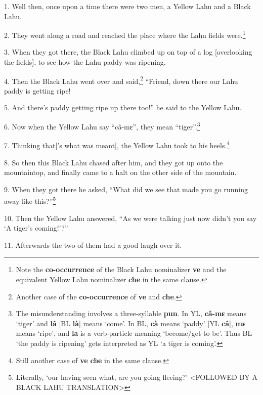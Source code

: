 \setcounter{footnote}{0}

1. Well then, once upon a time there were two men, a Yellow Lahu and a Black Lahu.

2. They went along a road and reached the place where the Lahu fields were.\footnote{Note the \textbf{co-occurrence} of the Black Lahu nominalizer \textbf{ve} and the equivalent Yellow Lahu nominalizer \textbf{che} in the same clause.}

3. When they got there, the Black Lahu climbed up on top of a log [overlooking the
fields], to see how the Lahu paddy was ripening.

4. Then the Black Lahu went over and said,\footnote{Another case of the \textbf{co-occurrence} of \textbf{ve} and \textbf{che}.} ``Friend, down there our Lahu paddy
is getting ripe!

5. And there's paddy getting ripe up there too!'' he said to the Yellow Lahu.

6. Now when the Yellow Lahu say ``câ-mɛ'', they mean ``tiger''.\footnote{The misunderstanding involves a three-syllable \textbf{pun}. In YL, \textbf{câ-mɛ} means `tiger' and \textbf{lâ} [BL \textbf{là}] means `come'. In BL, \textbf{cà} means `paddy' [YL \textbf{câ}], \textbf{mɛ} means `ripe', and \textbf{la} is a verb-particle meaning `become/get to be'. Thus BL `the paddy is ripening' gets interpreted as YL `a tiger is coming'.}

7. Thinking that['s what was meant], the Yellow Lahu took to his heels.\footnote{Still another case of \textbf{ve} \textbf{che} in the same clause.}

8. So then this Black Lahu chased after him, and they got up onto the mountaintop,
and finally came to a halt on the other side of the mountain.

9. When they got there he asked, ``What did we see that made you go running away
like this?''\footnote{Literally, `our having seen what, are you going fleeing?' <FOLLOWED BY A BLACK LAHU TRANSLATION>}

10. Then the Yellow Lahu answered, ``As we were talking just now didn't you say
`A tiger's coming!'?''

11. Afterwards the two of them had a good laugh over it.

